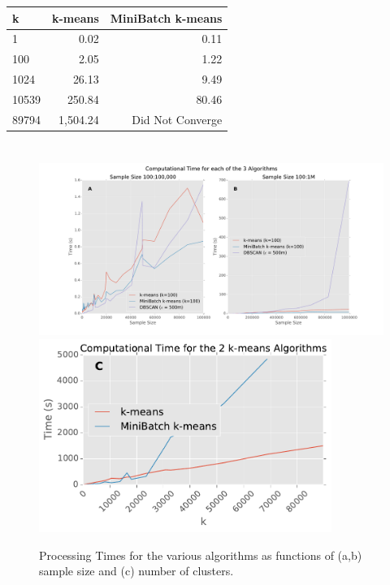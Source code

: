 \documentclass[12pt]{article}
\begin{document}
\begin{minipage}\linewidth
    \centering	
     \label{tab:title} 
    \begin{tabular}{lrr}
    
    \toprule
    k &  k-means & MiniBatch k-means \\
    \midrule
    1     &     0.02 &              0.11 \\
    100   &     2.05 &              1.22 \\
    1024  &    26.13 &              9.49 \\
    10539 &   250.84 &             80.46 \\
    89794 & 1,504.24 &               Did Not Converge \\
    \bottomrule
    \end{tabular}
\end{minipage}

\section{}

	\begin{figure}[H]
		\includegraphics[width=7.5in]{comptime}
		\centering
		\includegraphics[width=3.75in,]{comptime_k}
		\caption{Processing Times for the various algorithms as functions of (a,b) sample size and (c) number of clusters.} \label{figs}
	\end{figure}
	
\end{document}
